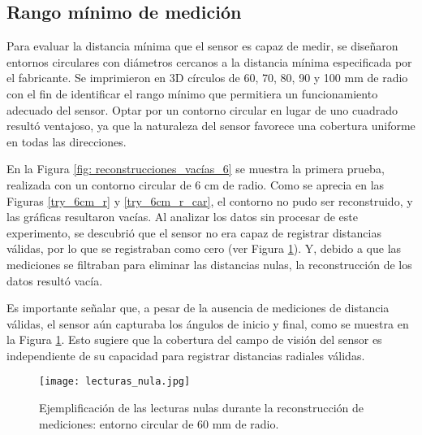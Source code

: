 \subsection{Rango mínimo de medición}
Para evaluar la distancia mínima que el sensor es capaz de medir, se diseñaron entornos circulares con diámetros cercanos a la distancia mínima especificada por el fabricante. Se imprimieron en 3D círculos de 60, 70, 80, 90 y 100 mm de radio con el fin de identificar el rango mínimo que permitiera un funcionamiento adecuado del sensor. Optar por un contorno circular en lugar de uno cuadrado resultó ventajoso, ya que la naturaleza del sensor favorece una cobertura uniforme en todas las direcciones.

En la Figura \ref{fig: reconstrucciones_vacías_6} se muestra la primera prueba, realizada con un contorno circular de 6 cm de radio. Como se aprecia en las Figuras \ref{try_6cm_r} y \ref{try_6cm_r_car}, el contorno no pudo ser reconstruido, y las gráficas resultaron vacías. Al analizar los datos sin procesar de este experimento, se descubrió que el sensor no era capaz de registrar distancias válidas, por lo que se registraban como cero (ver Figura \ref{fig:data_null}). Y, debido a que las mediciones se filtraban para eliminar las distancias nulas, la reconstrucción de los datos resultó vacía. 

Es importante señalar que, a pesar de la ausencia de mediciones de distancia válidas, el sensor aún capturaba los ángulos de inicio y final, como se muestra en la Figura \ref{fig:data_null}. Esto sugiere que la cobertura del campo de visión del sensor es independiente de su capacidad para registrar distancias radiales válidas.
\begin{figure}[H]
	\centering
	\texttt{[image: lecturas\_nula.jpg]}
	\caption{Ejemplificación de las lecturas nulas durante la reconstrucción de mediciones: entorno circular de 60 mm de radio.}
	\label{fig:data_null}
\end{figure}

